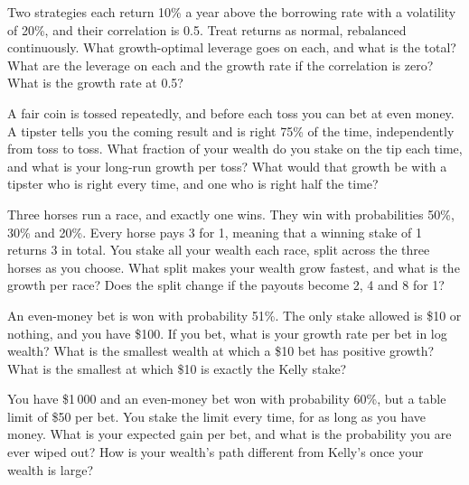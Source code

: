 \begin{question}\label{iq:iv2:betting-and-kelly:14}
Two strategies each return 10\% a year above the borrowing rate with a volatility of 20\%, and their correlation is 0.5. Treat returns as normal, rebalanced continuously. What growth-optimal leverage goes on each, and what is the total? What are the leverage on each and the growth rate if the correlation is zero? What is the growth rate at 0.5?
\end{question}

\begin{question}\label{iq:iv2:betting-and-kelly:15}
A fair coin is tossed repeatedly, and before each toss you can bet at even money. A tipster tells you the coming result and is right 75\% of the time, independently from toss to toss. What fraction of your wealth do you stake on the tip each time, and what is your long-run growth per toss? What would that growth be with a tipster who is right every time, and one who is right half the time?
\end{question}

\begin{question}\label{iq:iv2:betting-and-kelly:16}
Three horses run a race, and exactly one wins. They win with probabilities 50\%, 30\% and 20\%. Every horse pays 3 for 1, meaning that a winning stake of 1 returns 3 in total. You stake all your wealth each race, split across the three horses as you choose. What split makes your wealth grow fastest, and what is the growth per race? Does the split change if the payouts become 2, 4 and 8 for 1?
\end{question}

\begin{question}\label{iq:iv2:betting-and-kelly:17}
An even-money bet is won with probability 51\%. The only stake allowed is \$10 or nothing, and you have \$100. If you bet, what is your growth rate per bet in log wealth? What is the smallest wealth at which a \$10 bet has positive growth? What is the smallest at which \$10 is exactly the Kelly stake?
\end{question}

\begin{question}\label{iq:iv2:betting-and-kelly:18}
You have \$1\,000 and an even-money bet won with probability 60\%, but a table limit of \$50 per bet. You stake the limit every time, for as long as you have money. What is your expected gain per bet, and what is the probability you are ever wiped out? How is your wealth's path different from Kelly's once your wealth is large?
\end{question}

